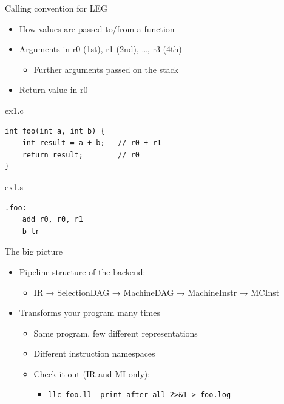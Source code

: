 
\begin{frame}[fragile]{Calling convention for LEG}

\begin{itemize}
    \item How values are passed to/from a function
    \item Arguments in r0 (1st), r1 (2nd), …, r3 (4th)
    \begin{itemize}
        \item Further arguments passed on the stack
    \end{itemize}
    \item Return value in r0
\end{itemize}

\begin{block}{ex1.c}
\begin{lstlisting}
int foo(int a, int b) {
    int result = a + b;   // r0 + r1
    return result;        // r0
}
\end{lstlisting}
\end{block}

\begin{block}{ex1.s}
\begin{lstlisting}
.foo:
    add r0, r0, r1
    b lr
\end{lstlisting}
\end{block}

\end{frame}


\begin{frame}{The big picture}

\begin{itemize}
    \item Pipeline structure of the backend:
    \begin{itemize}
        \item IR → SelectionDAG → MachineDAG  → MachineInstr → MCInst
    \end{itemize}
    \item Transforms your program many times
    \begin{itemize}
        \item Same program, few different representations
        \item Different instruction namespaces
        \item Check it out (IR and MI only):
        \begin{itemize}
            \item \texttt{llc foo.ll -print-after-all 2>\&1 > foo.log}
        \end{itemize}
    \end{itemize}
\end{itemize}

\end{frame}

